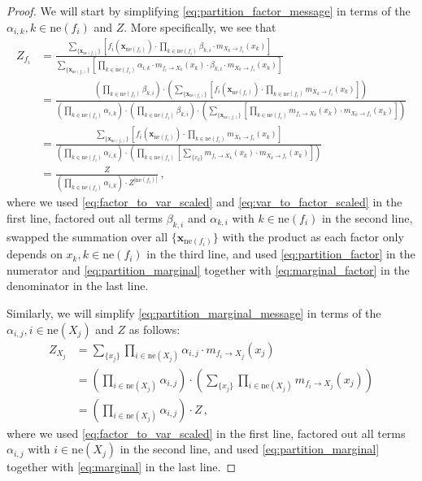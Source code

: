 \documentclass[a4paper]{article}
\newcommand{\bs}[1]{\boldsymbol{#1}}
\newcommand{\neighbours}[1]{{\mathrm{ne} \left( {#1} \right)}}
\theoremstyle{definition}
\begin{document}
\begin{proof}
    We will start by simplifying \eqref{eq:partition_factor_message} in terms of the $\alpha_{i,k}, k \in \neighbours{f_i}$ and $Z$. More specifically, we see that 
    \begin{align*}
        Z_{f_i} & = \frac{\sum_{\{\bs{x}_{\neighbours{f_i}}\}} \left[ f_i(\bs{x}_{\neighbours{f_i}}) \cdot \prod_{k \in \neighbours{f_i}} \beta_{k,i} \cdot m_{X_k \to f_i}(x_k) \right]}{\sum_{\{\bs{x}_{\neighbours{f_i}}\}} \left[ \prod_{k \in \neighbours{f_i}} \alpha_{i,k} \cdot m_{f_i \to X_k}(x_k) \cdot \beta_{k,i} \cdot m_{X_k \to f_i}(x_k) \right]} \\
        & = \frac{\left( \prod_{k \in \neighbours{f_i}} \beta_{k,i} \right) \cdot \left( \sum_{\{\bs{x}_{\neighbours{f_i}}\}} \left[ f_i(\bs{x}_{\neighbours{f_i}}) \cdot \prod_{k \in \neighbours{f_i}} m_{X_k \to f_i}(x_k) \right] \right)}{\left( \prod_{k \in \neighbours{f_i}} \alpha_{i,k} \right) \cdot \left( \prod_{k \in \neighbours{f_i}} \beta_{k,i} \right) \cdot \left( \sum_{\{\bs{x}_{\neighbours{f_i}}\}} \left[ \prod_{k \in \neighbours{f_i}} m_{f_i \to X_k}(x_k) \cdot m_{X_k \to f_i}(x_k) \right] \right)} \\
        & = \frac{\sum_{\{\bs{x}_{\neighbours{f_i}}\}} \left[ f_i(\bs{x}_{\neighbours{f_i}}) \cdot \prod_{k \in \neighbours{f_i}} m_{X_k \to f_i}(x_k) \right]}{\left( \prod_{k \in \neighbours{f_i}} \alpha_{i,k} \right) \cdot \left( \prod_{k \in \neighbours{f_i}} \left[ \sum_{\{ x_k \}} m_{f_i \to X_k}(x_k) \cdot m_{X_k \to f_i}(x_k) \right] \right)} \\
        & = \frac{Z}{\left( \prod_{k \in \neighbours{f_i}} \alpha_{i,k} \right) \cdot Z^{\left| \neighbours{f_i} \right|}} \,,
    \end{align*}
    where we used \eqref{eq:factor_to_var_scaled} and \eqref{eq:var_to_factor_scaled} in the first line, factored out all terms $\beta_{k,i}$ and $\alpha_{k,i}$ with $k \in \neighbours{f_i}$ in the second line, swapped the summation over all $\{\bs{x}_{\neighbours{f_i}}\}$ with the product as each factor only depends on $x_k, k \in \neighbours{f_i}$ in the third line, and used \eqref{eq:partition_factor} in the numerator and \eqref{eq:partition_marginal} together with \eqref{eq:marginal_factor} in the denominator in the last line.

    Similarly, we will simplify \eqref{eq:partition_marginal_message} in terms of the $\alpha_{i,j}, i \in \neighbours{X_j}$ and $Z$ as follows:
    \begin{align*}
        Z_{X_j} & = \sum_{\{ x_j \}} \prod_{i \in \neighbours{X_j}} \alpha_{i,j} \cdot m_{f_i \to X_j}(x_j) \\
        & = \left( \prod_{i \in \neighbours{X_j}} \alpha_{i,j} \right) \cdot \left( \sum_{\{ x_j \}} \prod_{i \in \neighbours{X_j}} m_{f_i \to X_j}(x_j) \right) \\
        & = \left( \prod_{i \in \neighbours{X_j}} \alpha_{i,j} \right) \cdot Z \,,
    \end{align*}
    where we used \eqref{eq:factor_to_var_scaled} in the first line, factored out all terms $\alpha_{i,j}$ with $i \in \neighbours{X_j}$ in the second line, and used \eqref{eq:partition_marginal} together with \eqref{eq:marginal} in the last line.


\end{proof}
\end{document}
